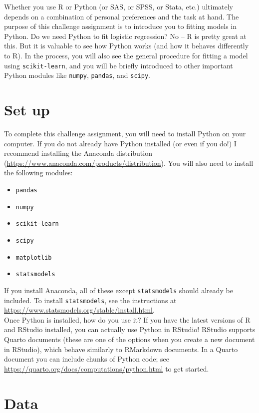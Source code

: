 \documentclass[11pt]{article}
\begin{document}
\noindent Whether you use R or Python (or SAS, or SPSS, or Stata, etc.) ultimately depends on a combination of personal preferences and the task at hand. The purpose of this challenge assignment is to introduce you to fitting models in Python. Do we need Python to fit logistic regression? No -- R is pretty great at this. But it is valuable to see how Python works (and how it behaves differently to R). In the process, you will also see the general procedure for fitting a model using \texttt{scikit-learn}, and you will be briefly introduced to other important Python modules like \texttt{numpy}, \texttt{pandas}, and \texttt{scipy}.

\section*{Set up}

To complete this challenge assignment, you will need to install Python on your computer. If you do not already have Python installed (or even if you do!) I recommend installing the Anaconda distribution (\url{https://www.anaconda.com/products/distribution}). You will also need to install the following modules:
\begin{itemize}
\item \texttt{pandas}
\item \texttt{numpy}
\item \texttt{scikit-learn}
\item \texttt{scipy}
\item \texttt{matplotlib}
\item \texttt{statsmodels}
\end{itemize}
If you install Anaconda, all of these except \texttt{statsmodels} should already be included. To install \texttt{statsmodels}, see the instructions at \url{https://www.statsmodels.org/stable/install.html}.\\

\noindent Once Python is installed, how do you use it? If you have the latest versions of R and RStudio installed, you can actually use Python in RStudio! RStudio supports Quarto documents (these are one of the options when you create a new document in RStudio), which behave similarly to RMarkdown documents. In a Quarto document you can include chunks of Python code; see \url{https://quarto.org/docs/computations/python.html} to get started.

\section*{Data}
\end{document}
